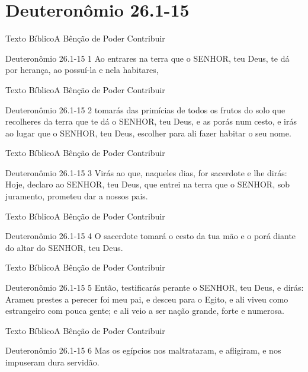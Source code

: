 \documentclass[14pt,aspectratio=169]{beamer}
\author{Egmon Pereira}
\title{\TT}
\institute{Igreja Presbiteriana Central}
\date{06 de Janeiro de 2019}
\newcommand{\TT}{A Bênção de Poder Contribuir}
\newcommand{\TB}{Texto Bíblico}
\newcommand{\DT}{Deuteronômio 26.1-15}
\begin{document}
\begin{frame}
\titlepage
\end{frame}

\LARGE

\section{\DT}
\begin{frame}{\TB}{\TT}\pause
 \begin{block}{\DT}
1 Ao entrares na terra que o SENHOR, teu Deus, te dá por herança, ao possuí-la e nela habitares,
 \end{block}
\end{frame}

\begin{frame}{\TB}{\TT}
 \begin{block}{\DT}
 \Large
2 tomarás das primícias de todos os frutos do solo que recolheres da terra que te dá o SENHOR, teu Deus, e as porás num cesto, e irás ao lugar que o SENHOR, teu Deus, escolher para ali fazer habitar o seu nome.
 \end{block}
\end{frame}

\begin{frame}{\TB}{\TT}
 \begin{block}{\DT}
3 Virás ao que, naqueles dias, for sacerdote e lhe dirás: Hoje, declaro ao SENHOR, teu Deus, que entrei na terra que o SENHOR, sob juramento, prometeu dar a nossos pais.
 \end{block}
\end{frame}

\begin{frame}{\TB}{\TT}
 \begin{block}{\DT}
4 O sacerdote tomará o cesto da tua mão e o porá diante do altar do SENHOR, teu Deus.
 \end{block}
\end{frame}

\begin{frame}{\TB}{\TT}
 \begin{block}{\DT}
 \Large
5 Então, testificarás perante o SENHOR, teu Deus, e dirás: Arameu prestes a perecer foi meu pai, e desceu para o Egito, e ali viveu como estrangeiro com pouca gente; e ali veio a ser nação grande, forte e numerosa.
 \end{block}
\end{frame}

\begin{frame}{\TB}{\TT}
 \begin{block}{\DT}
6 Mas os egípcios nos maltrataram, e afligiram, e nos impuseram dura servidão.
 \end{block}
\end{frame}
\end{document}
